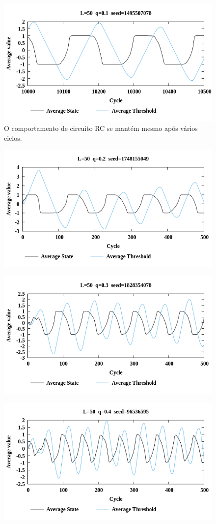 \documentclass[12pt,a4paper,final]{article}
\begin{document}
  \begin{figure}[h]
    \centering
    \includegraphics[width=.7\linewidth]{ICA-L50-q0_100-seed1495507078-AvgStateAvgThresVsCycle10000.png}
    \caption{O comportamento de circuito RC se mantém mesmo após vários ciclos.}
  \end{figure}

  \begin{figure}[h]
    \centering
    \includegraphics[width=.7\linewidth]{ICA-L50-q0_200-seed1748155049-AvgStateAvgThresVsCycle.png}
    \caption{}
  \end{figure}
  
  \begin{figure}[h]
    \centering
    \includegraphics[width=.7\linewidth]{ICA-L50-q0_300-seed1828354078-AvgStateAvgThresVsCycle.png}
    \caption{}
  \end{figure}

  \begin{figure}[h]
    \centering
    \includegraphics[width=.7\linewidth]{ICA-L50-q0_400-seed96536595-AvgStateAvgThresVsCycle.png}
    \caption{}
  \end{figure}
  
\end{document}
